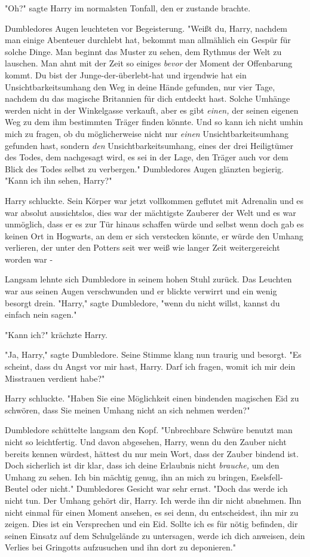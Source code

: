 {"Oh?" sagte Harry im normalsten Tonfall, den er zustande brachte.

Dumbledores Augen leuchteten vor Begeisterung. "Weißt du, Harry, nachdem man einige Abenteuer durchlebt hat, bekommt man allmählich ein Gespür für solche Dinge. Man beginnt das Muster zu sehen, dem Rythmus der Welt zu lauschen. Man ahnt mit der Zeit so einiges \emph{bevor} der Moment der Offenbarung kommt. Du bist der Junge-der-überlebt-hat und irgendwie hat ein Unsichtbarkeitsumhang den Weg in deine Hände gefunden, nur vier Tage, nachdem du das magische Britannien für dich entdeckt hast. Solche Umhänge werden nicht in der Winkelgasse verkauft, aber es gibt \emph{einen,} der seinen eigenen Weg zu dem ihm bestimmten Träger finden könnte. Und so kann ich nicht umhin mich zu fragen, ob du möglicherweise nicht nur \emph{einen} Unsichtbarkeitsumhang gefunden hast, sondern \emph{den} Unsichtbarkeitsumhang, eines der drei Heiligtümer des Todes, dem nachgesagt wird, es sei in der Lage, den Träger auch vor dem Blick des Todes selbst zu verbergen." Dumbledores Augen glänzten begierig. "Kann ich ihn sehen, Harry?"

Harry schluckte. Sein Körper war jetzt vollkommen geflutet mit Adrenalin und es war absolut aussichtslos, dies war der mächtigste Zauberer der Welt und es war unmöglich, dass er es zur Tür hinaus schaffen würde und selbst wenn doch gab es keinen Ort in Hogwarts, an dem er sich verstecken könnte, er würde den Umhang verlieren, der unter den Potters seit wer weiß wie langer Zeit weitergereicht worden war -

Langsam lehnte sich Dumbledore in seinem hohen Stuhl zurück. Das Leuchten war aus seinen Augen verschwunden und er blickte verwirrt und ein wenig besorgt drein. "Harry," sagte Dumbledore, "wenn du nicht willst, kannst du einfach nein sagen."

"Kann ich?" krächzte Harry.

"Ja, Harry," sagte Dumbledore. Seine Stimme klang nun traurig und besorgt. "Es scheint, dass du Angst vor mir hast, Harry. Darf ich fragen, womit ich mir dein Misstrauen verdient habe?"

Harry schluckte. "Haben Sie eine Möglichkeit einen bindenden magischen Eid zu schwören, dass Sie meinen Umhang nicht an sich nehmen werden?"

Dumbledore schüttelte langsam den Kopf. "Unbrechbare Schwüre benutzt man nicht so leichtfertig. Und davon abgesehen, Harry, wenn du den Zauber nicht bereits kennen würdest, hättest du nur mein Wort, dass der Zauber bindend ist. Doch sicherlich ist dir klar, dass ich deine Erlaubnis nicht \emph{brauche,} um den Umhang zu sehen. Ich bin mächtig genug, ihn an mich zu bringen, Eselsfell-Beutel oder nicht." Dumbledores Gesicht war sehr ernst. "Doch das werde ich nicht tun. Der Umhang gehört dir, Harry. Ich werde ihn dir nicht abnehmen. Ihn nicht einmal für einen Moment ansehen, es sei denn, du entscheidest, ihn mir zu zeigen. Dies ist ein Versprechen und ein Eid. Sollte ich es für nötig befinden, dir seinen Einsatz auf dem Schulgelände zu untersagen, werde ich dich anweisen, dein Verlies bei Gringotts aufzusuchen und ihn dort zu deponieren."

}
